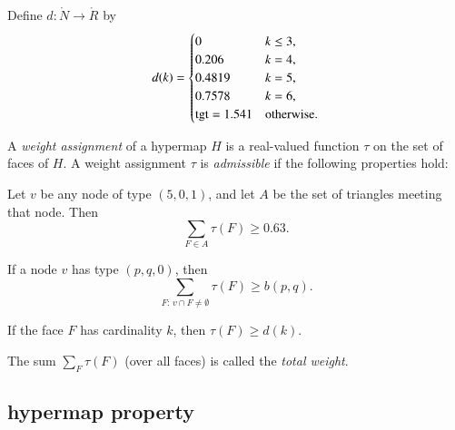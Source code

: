 \begin{definition}[d]
    Define $d:\ring{N}\to \ring{R}$ by
  $$d(k) = \begin{cases}
    0 & k\le3, \\
    0.206 & k=4, \\
    0.4819 & k=5, \\
    0.7578 & k=6, \\
    {\operatorname{tgt}}=1.541 & \text{otherwise}.
  \end{cases}
  $$
%
\end{definition}




\begin{definition}
%
A {\it weight assignment\/} of a hypermap $H$ is a real-valued function $\tau$ on
the set of faces of $H$. A weight assignment $\tau$ is {\it admissible} if the
following properties hold:
%
\begin{nomerate}
 \item {} Let $v$ be any node of type $(5,0,1)$, and let $A$ be the set of
triangles meeting that node.
        Then
        $$\sum_{F\in A} \tau(F)
            \ge  0.63.$$
 \item {} If a node $v$ has type $(p,q,0)$, then
        $$\sum_{F:\,v\cap F\ne\emptyset} \tau(F) \ge b(p,q).$$
  \item {} If the face $F$ has cardinality $k$, then
        $\tau(F) \ge d(k)$.
\end{nomerate}
%
%

The sum $\sum_F \tau(F)$ (over all faces) is called the {\it total weight}. %
%
\end{definition}





\subsection{hypermap property}
\label{sec:graphproperty}

